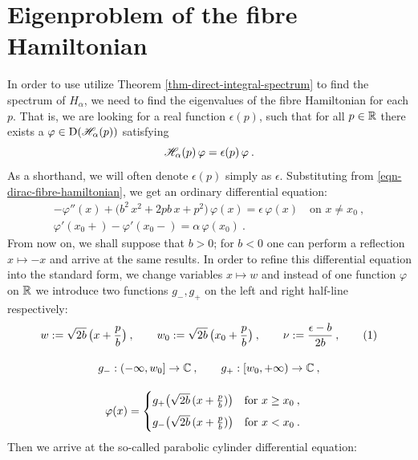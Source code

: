 \section{Eigenproblem of the fibre Hamiltonian} \label{section-dirac-eigenproblem}
In order to use utilize Theorem \ref{thm-direct-integral-spectrum} to find the spectrum of $H_\alpha$, we need to find the eigenvalues of the fibre Hamiltonian for each $p$. That is, we are looking for a real function $\epsilon(p)$, such that for all $p \in \mathbb{R}$ there exists a $\varphi \in \mathrm{D}(\mathscr{H}_\alpha(p))$ satisfying
\begin{equation*}
    \mathscr{H}_\alpha(p) \, \varphi = \epsilon(p) \, \varphi \: .
\end{equation*}
As a shorthand, we will often denote $\epsilon(p)$ simply as $\epsilon$. Substituting from \eqref{eqn-dirac-fibre-hamiltonian}, we get an ordinary differential equation:
\begin{gather*}
    -\varphi''(x)
    + \big( b^2 \, x^2 + 2 p b \, x + p^2 \big) \, \varphi(x)
    = \epsilon \, \varphi(x)
    \quad \text{on } x \neq x_0 \: ,
    \\
    \varphi'(x_0+) - \varphi'(x_0-) = \alpha \, \varphi(x_0)
    \: .
\end{gather*}
From now on, we shall suppose that $b>0$; for $b<0$ one can perform a reflection $x \mapsto -x$ and arrive at the same results. In order to refine this differential equation into the standard form, we change variables $x\mapsto w$ and instead of one function $\varphi$ on $\mathbb{R}$ we introduce two functions $g_-, g_+$ on the left and right half-line respectively:
\begin{gather*}
    w \coloneqq \sqrt{2b} \, \big( x + \frac{p}{b} \big) \: ,
    \qquad
    w_0 \coloneqq \sqrt{2b}\,\big( x_0 + \frac{p}{b} \big) \: ,
    \qquad
    \nu \coloneqq \frac{\epsilon - b}{2b} \: ,
    \numberthis
    \label{eqn-w-nu-definition}
    \\[10pt]
    g_-: (-\infty, w_0] \to \C \: , \qquad
    g_+: [w_0, +\infty) \to \C \: ,
    \\[10pt]
    \varphi(x) = \begin{cases}
        g_+ \big( \sqrt{2b} \, (x + \frac{p}{b}) \big)
        \quad \text{for } x \geq x_0 \: ,
        \\[5pt]
        g_- \big( \sqrt{2b} \, (x + \frac{p}{b}) \big)
        \quad \text{for } x < x_0 \: .
    \end{cases}
\end{gather*}
Then we arrive at the so-called parabolic cylinder differential equation:
